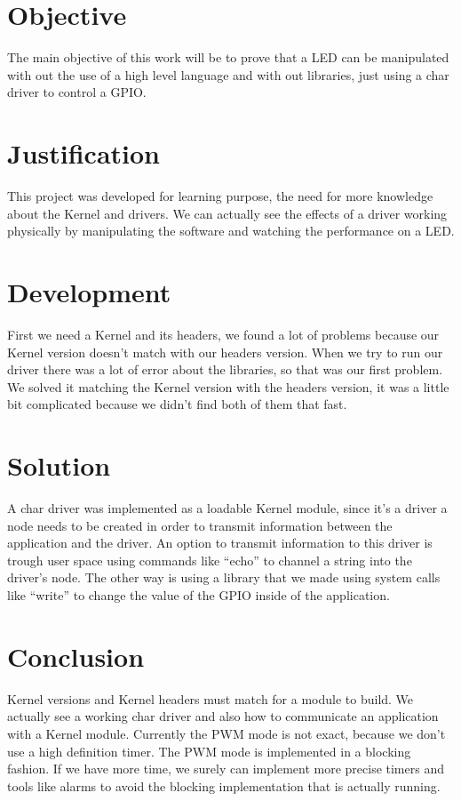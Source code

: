 \documentclass[a4paper]{article}
\begin{document}
\section{Objective}

The main objective of this work will be to prove that a LED can be manipulated with out the use of a high level language and with out libraries, just using a char driver to control a GPIO.

\section{Justification}

This project was developed for learning purpose, the need for more knowledge about the Kernel and drivers. We can actually see the effects of a driver working physically by manipulating the software and watching the performance on a LED.

\section{Development}

First we need a Kernel and its headers, we found a lot of problems because our Kernel version doesn't match with our headers version. When we try to run our driver there was a lot of error about the libraries, so that was our first problem. We solved it matching the Kernel version with the headers version, it was a little bit complicated because we didn't find both of them that fast.  


\section{Solution}

A char driver was implemented as a loadable Kernel module, since it’s a driver a node needs to be created in order to transmit information between the application and the driver. An option to transmit information to this driver is trough user space using commands like “echo” to channel a string into the driver’s node. The other way is using a library that we made using system calls like “write” to change the value of the GPIO inside of the application.

\section{Conclusion}
Kernel versions and Kernel headers must match for a module to build. We actually see a working char driver and also how to communicate an application with a Kernel module. Currently the PWM mode is not exact, because we don’t use a high definition timer. The PWM mode is implemented in a blocking fashion. If we have more time, we surely can implement more precise timers and tools like alarms to avoid the blocking implementation that is actually running. 
\end{document}
